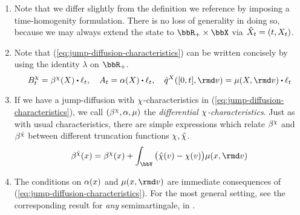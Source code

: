 \begin{remark}
  \label{remark:jump-diffusions}
  \begin{enumerate}[label=(\alph*)]
    \item
      Note that we differ slightly from the definition we reference by imposing a time-homogenity formulation.
      There is no loss of generality in doing so, because we may always extend the state to $\bbR_+ \times \stateSpace$ via $\hat{X}_t = (t, X_t)$.
    \item
      Note that (\ref{eq:jump-diffusion-characteristics}) can be written concisely by using the identity $\lambda$ on $\bbR_+$.
      \[
        B^\trunc_t = \affDrift^\trunc(\X) \shortInt \leb_t, \quad
        A_t = \affDiff(\X) \shortInt \leb_t, \quad
        \predproj{\jumpMeas^\X}([0,t],\rmd\markVar) = \affJump(\X, \rmd\markVar) \shortInt \leb_t
      \]
    \item
      \label{remark:characteristic-switch}
      If we have a jump-diffusion with $\chi$-characteristics in (\ref{eq:jump-diffusion-characteristics}), we call $(\beta^\chi, \alpha, \mu)$ the \emph{differential $\chi$-characteristics}.
      Just as with usual characteristics, there are simple expressions which relate $\beta^\chi$ and $\beta^{\hat{\chi}}$ between different truncation functions $\chi, \hat{\chi}$.
      \begin{equation}
        \label{eq:affDrift-relationship}
        \affDrift^{\hat\trunc}(\stateVar) = \affDrift^\trunc(\stateVar) + \int_\vecSpace \big(\hat\trunc(\markVar) - \trunc(\markVar) \big) \affJump(\stateVar, \rmd\markVar)
      \end{equation}
    \item
      The conditions on $\alpha(x)$ and $\affJump(\stateVar, \rmd\markVar)$ are immediate consequences of (\ref{eq:jump-diffusion-characteristics}).
      For the most general setting, see the corresponding result for \emph{any} semimartingale, in \cite[Proposition II.2.9]{jacod2003}.
  \end{enumerate}
\end{remark}
